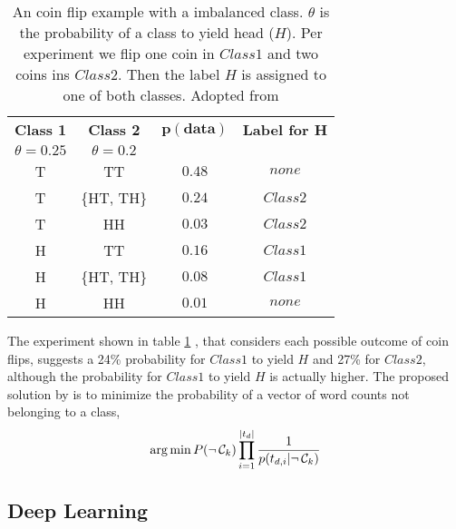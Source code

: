 \begin{table}[h!]
  \centering
  \caption{An coin flip example with a imbalanced class. $\theta$ is the probability of a class to yield head ($H$). Per experiment we flip one coin in $Class 1$ and two coins ins $Class 2.$ Then the label $H$ is assigned to one of both classes. Adopted from \cite{Rennie2003}}
  \setlength{\tabcolsep}{1.5em}
  \begin{tabular}{@{}cccc@{}}
    \toprule
    \textbf{Class 1} & \textbf{Class 2} & $\mathbf{p(data)}$ & \textbf{Label for H} \\
    $\theta = 0.25$ & $\theta=0.2$ & & \\
    \midrule
    T & TT & $0.48$ & $none$ \\
    T & \{HT, TH\} & $0.24$ & $Class 2$ \\
    T & HH & $0.03$ & $Class 2$ \\
    H & TT & $0.16$ & $Class 1$ \\
    H & \{HT, TH\} & $0.08$ & $Class 1$ \\
    H & HH & $0.01$ & $none$ \\
    \bottomrule
  \end{tabular}
  \label{table:coinflip}
\end{table}
The experiment shown in table \ref{table:coinflip} , that considers each possible outcome of coin flips, suggests a 24\% probability for $Class 1$ to yield $H$ and 27\% for $Class 2$, although the probability for $Class 1$ to yield $H$ is actually higher.
The proposed solution by \cite{Rennie2003} is to minimize the probability of a vector of word counts not belonging to a class,
\[\operatorname*{arg\,min} P(\neg\, \mathcal{C}_k) \prod_{i=1}^{|t_{d}|} \frac{1}{p(t_{d,i}|\neg\, \mathcal{C}_k)} \]

\subsection{Deep Learning}
